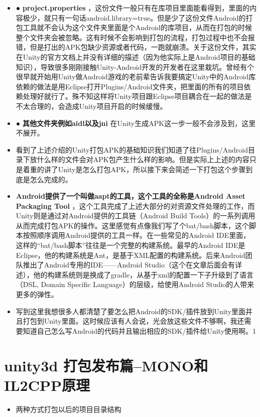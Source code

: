 \documentclass[9pt, b5paper]{article}
\begin{document}
\begin{itemize}
\item ● \textbf{project.properties} ，这份文件一般只有在库项目里面能看得到，里面的内容极少，就只有一句话android.library=true。但是少了这份文件Android的打包工具就不会认为这个文件夹里面是个Android的库项目，从而在打包的时候整个文件夹会被忽略。这有时候不会影响到打包的流程，打包过程中也不会报错，但是打出的APK包缺少资源或者代码，一跑就崩溃。关于这份文件，其实在Unity的官方文档上并没有详细的描述（因为他实际上是Android项目的基础知识），导致很多刚刚接触Unity-Android开发的开发者在这里栽坑。曾经有个很早就开始用Unity做Android游戏的老前辈告诉我要搞定Unity中的Android库依赖的做法是用Eclipse打开Plugins/Android文件夹，把里面的所有的项目依赖处理好就行了。殊不知这样将Unity项目跟Eclipse项目耦合在一起的做法是不太合理的，会造成Unity项目开启的时候缓慢。
\item ● \textbf{其他文件夹例如aidl以及jni} 在Unity生成APK这一步一般不会涉及到，这里不展开。
\item 看到了上述介绍的Unity打包APK的基础知识我们知道了往Plugins/Android目录下放什么样的文件会对APK包产生什么样的影响。但是实际上上述的内容只是着重的讲了Unity是怎么打包APK，所以接下来会简述一下打包这个步骤到底是怎么完成的。
\item \textbf{Android提供了一个叫做aapt的工具，这个工具的全称是Android Asset Packaging Tool} ，这个工具完成了上述大部分的对资源文件处理的工作，而Unity则是通过对Android提供的工具链（Android Build Tools）的一系列调用从而完成打包APK的操作。这里感觉有点像我们写了个bat/bash脚本，这个脚本按照顺序调用Android提供的工具一样。在一些常见的Android IDE里面，这样的“bat/bash脚本”往往是一个完整的构建系统。最早的Android IDE是Eclipse，他的构建系统是Ant，是基于XML配置的构建系统。后来Android团队推出了Android专用的IDE——Android Studio（这个在文章后面会有详述），他的构建系统则是换成了gradle，从基于xml的配置一下子升级到了语言（DSL, Domain Specific Language）的层级，给使用Android Studio的人带来更多的弹性。
\item 写到这里我想很多人都清楚了要怎么把Android的SDK/插件放到Unity里面并且打包到Unity里面。这时候应该有人会说，光会放这些文件不够啊，我还需要知道自己怎么写Android的代码并且输出相应的SDK/插件给Unity使用啊。1
\end{itemize}

\section{unity3d 打包发布篇--MONO和IL2CPP原理}
\label{sec-4}
\begin{itemize}
\item 两种方式打包以后的项目目录结构
\end{itemize}
\end{document}
